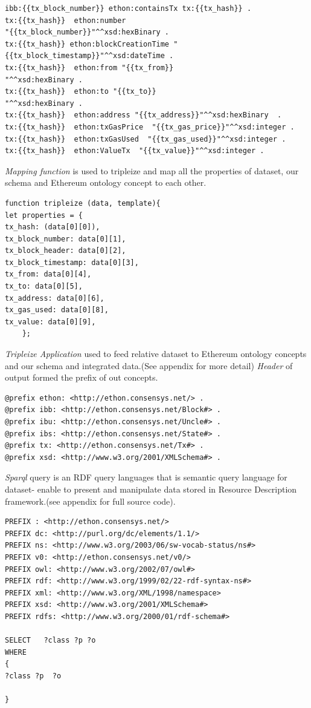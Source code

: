 \begin{lstlisting}
ibb:{{tx_block_number}} ethon:containsTx tx:{{tx_hash}} .
tx:{{tx_hash}}  ethon:number 
"{{tx_block_number}}"^^xsd:hexBinary .
tx:{{tx_hash}} ethon:blockCreationTime "{{tx_block_timestamp}}"^^xsd:dateTime .	
tx:{{tx_hash}}  ethon:from "{{tx_from}}
"^^xsd:hexBinary .	
tx:{{tx_hash}}  ethon:to "{{tx_to}}
"^^xsd:hexBinary .	
tx:{{tx_hash}}  ethon:address "{{tx_address}}"^^xsd:hexBinary  .	
tx:{{tx_hash}}  ethon:txGasPrice  "{{tx_gas_price}}"^^xsd:integer .	
tx:{{tx_hash}}  ethon:txGasUsed  "{{tx_gas_used}}"^^xsd:integer .	
tx:{{tx_hash}}  ethon:ValueTx  "{{tx_value}}"^^xsd:integer .
\end{lstlisting}

\textit{Mapping function} is used to tripleize and map all the properties of dataset, our schema and Ethereum ontology concept to each other.\\

\begin{lstlisting}
function tripleize (data, template){
let properties = {
tx_hash: (data[0][0]),
tx_block_number: data[0][1],
tx_block_header: data[0][2],
tx_block_timestamp: data[0][3],
tx_from: data[0][4],
tx_to: data[0][5],
tx_address: data[0][6],
tx_gas_used: data[0][8],
tx_value: data[0][9],
	};
\end{lstlisting}

\textit{Tripleize Application} used to feed relative dataset to Ethereum ontology concepts and our schema and integrated data.(See appendix for more detail)
\textit{Header} of output formed the prefix of out concepts.
\begin{lstlisting}
@prefix ethon: <http://ethon.consensys.net/> .
@prefix ibb: <http://ethon.consensys.net/Block#> .
@prefix ibu: <http://ethon.consensys.net/Uncle#> .
@prefix ibs: <http://ethon.consensys.net/State#> .
@prefix tx: <http://ethon.consensys.net/Tx#> .
@prefix xsd: <http://www.w3.org/2001/XMLSchema#> .
\end{lstlisting}
\textit{Sparql} query is an RDF query languages that is semantic query language for dataset- enable to present and manipulate data  stored in Resource Description framework.(see appendix for full source code). \\

\begin{lstlisting}
PREFIX : <http://ethon.consensys.net/>
PREFIX dc: <http://purl.org/dc/elements/1.1/>
PREFIX ns: <http://www.w3.org/2003/06/sw-vocab-status/ns#>
PREFIX v0: <http://ethon.consensys.net/v0/>
PREFIX owl: <http://www.w3.org/2002/07/owl#>
PREFIX rdf: <http://www.w3.org/1999/02/22-rdf-syntax-ns#>
PREFIX xml: <http://www.w3.org/XML/1998/namespace>
PREFIX xsd: <http://www.w3.org/2001/XMLSchema#>
PREFIX rdfs: <http://www.w3.org/2000/01/rdf-schema#>

SELECT   ?class ?p ?o
WHERE
{
?class ?p  ?o

}

\end{lstlisting}

